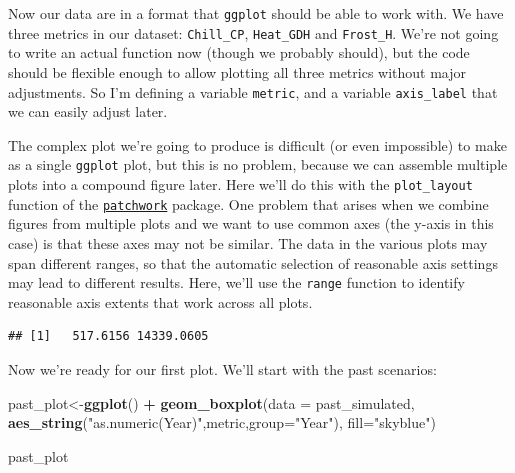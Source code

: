 \documentclass[
]{book}
\newenvironment{Shaded}{\begin{snugshade}}{\end{snugshade}}
\newcommand{\CommentTok}[1]{\textcolor[rgb]{0.56,0.35,0.01}{\textit{#1}}}
\newcommand{\DataTypeTok}[1]{\textcolor[rgb]{0.13,0.29,0.53}{#1}}
\newcommand{\KeywordTok}[1]{\textcolor[rgb]{0.13,0.29,0.53}{\textbf{#1}}}
\newcommand{\NormalTok}[1]{#1}
\newcommand{\OperatorTok}[1]{\textcolor[rgb]{0.81,0.36,0.00}{\textbf{#1}}}
\newcommand{\StringTok}[1]{\textcolor[rgb]{0.31,0.60,0.02}{#1}}
\begin{document}
Now our data are in a format that \texttt{ggplot} should be able to work with. We have three metrics in our dataset: \texttt{Chill\_CP}, \texttt{Heat\_GDH} and \texttt{Frost\_H}. We're not going to write an actual function now (though we probably should), but the code should be flexible enough to allow plotting all three metrics without major adjustments. So I'm defining a variable \texttt{metric}, and a variable \texttt{axis\_label} that we can easily adjust later.

The complex plot we're going to produce is difficult (or even impossible) to make as a single \texttt{ggplot} plot, but this is no problem, because we can assemble multiple plots into a compound figure later. Here we'll do this with the \texttt{plot\_layout} function of the \href{https://cran.r-project.org/web/packages/patchwork/patchwork.pdf}{\texttt{patchwork}} package. One problem that arises when we combine figures from multiple plots and we want to use common axes (the y-axis in this case) is that these axes may not be similar. The data in the various plots may span different ranges, so that the automatic selection of reasonable axis settings may lead to different results. Here, we'll use the \texttt{range} function to identify reasonable axis extents that work across all plots.

\begin{Shaded}
\end{Shaded}

\begin{verbatim}
## [1]   517.6156 14339.0605
\end{verbatim}

Now we're ready for our first plot. We'll start with the past scenarios:

\begin{Shaded}
\begin{Highlighting}[]
\NormalTok{past_plot<-}\KeywordTok{ggplot}\NormalTok{() }\OperatorTok{+}
\StringTok{  }\KeywordTok{geom_boxplot}\NormalTok{(}\DataTypeTok{data =}\NormalTok{ past_simulated,}
               \KeywordTok{aes_string}\NormalTok{(}\StringTok{"as.numeric(Year)"}\NormalTok{,metric,}\DataTypeTok{group=}\StringTok{"Year"}\NormalTok{),}
               \DataTypeTok{fill=}\StringTok{"skyblue"}\NormalTok{)}

\NormalTok{past_plot}
\end{Highlighting}
\end{Shaded}
\end{document}
